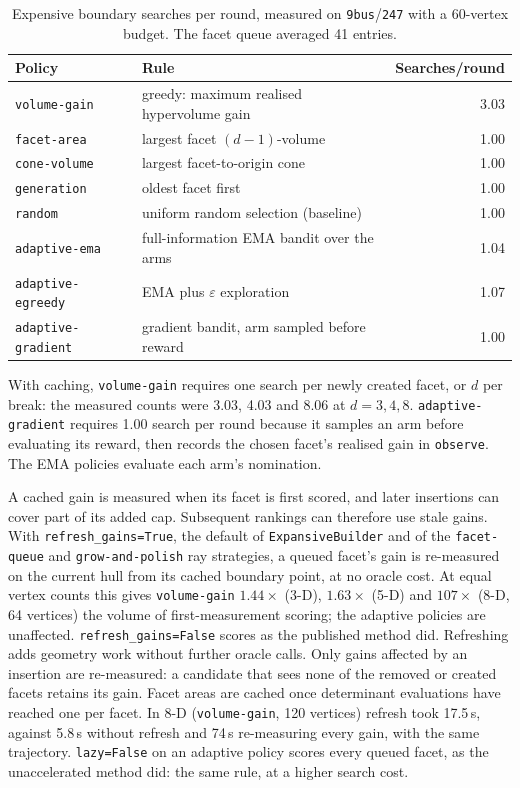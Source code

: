 \documentclass[11pt,a4paper]{report}
\newcommand{\why}[1]{\par\medskip\begingroup\noindent #1\par\endgroup\medskip}
\newcommand{\code}[1]{\texttt{\small #1}}
\begin{document}
\begin{table}[h]
\centering\small
\caption{Expensive boundary searches per round, measured on \code{9bus}/\code{247}
with a 60-vertex budget. The facet queue averaged 41 entries.}
\label{tab:policies}
\begin{tabular}{@{}llr@{}}
\toprule
Policy & Rule & Searches/round \\
\midrule
\code{volume-gain}       & greedy: maximum realised hypervolume gain & 3.03 \\
\code{facet-area}        & largest facet $(d{-}1)$-volume            & 1.00 \\
\code{cone-volume}       & largest facet-to-origin cone              & 1.00 \\
\code{generation}        & oldest facet first                        & 1.00 \\
\code{random}            & uniform random selection (baseline)       & 1.00 \\
\code{adaptive-ema}      & full-information EMA bandit over the arms & 1.04 \\
\code{adaptive-egreedy}  & EMA plus $\varepsilon$ exploration        & 1.07 \\
\code{adaptive-gradient} & gradient bandit, arm sampled before reward& 1.00 \\
\bottomrule
\end{tabular}
\end{table}

\why{With caching, \code{volume-gain} requires one search per newly created
facet, or $d$ per break: the measured counts were 3.03, 4.03 and 8.06 at
$d = 3, 4, 8$. \code{adaptive-gradient} requires 1.00 search per round because
it samples an arm before evaluating its reward, then records the chosen
facet's realised gain in \code{observe}. The EMA policies evaluate each arm's
nomination.}

A cached gain is measured when its facet is first scored, and later insertions
can cover part of its added cap. Subsequent rankings can therefore use stale
gains. With \code{refresh\_gains=True}, the default of
\code{ExpansiveBuilder} and of the \code{facet-queue} and
\code{grow-and-polish} ray strategies, a queued facet's gain is re-measured on
the current hull from its cached boundary point, at no oracle cost. At equal
vertex counts this gives \code{volume-gain} $1.44\times$ (3-D), $1.63\times$
(5-D) and $107\times$ (8-D, 64 vertices) the volume of first-measurement
scoring; the adaptive policies are unaffected. \code{refresh\_gains=False}
scores as the published method did.
Refreshing adds geometry work without further oracle calls. Only gains
affected by an insertion are re-measured: a candidate that sees none of the
removed or created facets retains its gain. Facet areas are cached once
determinant evaluations have reached one per facet. In 8-D
(\code{volume-gain}, 120 vertices) refresh took 17.5\,s, against
5.8\,s without refresh and 74\,s re-measuring every gain, with the same
trajectory. \code{lazy=False} on an adaptive policy scores every queued facet,
as the unaccelerated method did: the same rule, at a higher search cost.
\end{document}
